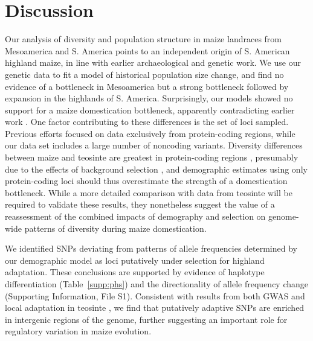  \section*{Discussion}

Our analysis of diversity and population structure in maize landraces from Mesoamerica and S. America points to an independent origin of S. American highland maize, in line with earlier archaeological \cite[]{Piperno_2006_69,Perry_2006_16511492,Grobman_2012_22307642} and genetic \citep{vanHeerwaarden_2011_21189301} work. 
We use our genetic data to fit a model of historical population size change, and find no evidence of a bottleneck in Mesoamerica but a strong bottleneck followed by expansion in the highlands of S. America. 
Surprisingly, our models showed no support for a maize domestication bottleneck, apparently contradicting earlier work \cite[]{Eyre-Walker_1998_9539756,Tenaillon_2004_15014173,Wright_2005_15919994}. 
One factor contributing to these differences is the set of loci sampled. 
Previous efforts focused on data exclusively from protein-coding regions, while our data set includes a large number of noncoding variants.
Diversity differences between maize and teosinte are greatest in protein-coding regions \citep{Hufford_2012_22660546}, presumably due to the effects of background selection \citep{Charlesworth_1993_8375663}, and demographic estimates using only protein-coding loci should thus overestimate the strength of a domestication bottleneck.
While a more detailed comparison with data from teosinte will be required to validate these results, they nonetheless suggest the value of a reassessment of the combined impacts of demography and selection on genome-wide patterns of diversity during maize domestication.

We identified SNPs deviating from patterns of allele frequencies determined by our demographic model as loci putatively under selection for highland adaptation.
These conclusions are supported by evidence of haplotype differentiation (Table~\ref{supp:phs}) and the directionality of allele frequency change (Supporting Information, File S1).
Consistent with results from both GWAS \citep{Wallace_2014_25474422} and local adaptation in teosinte \citep{Pyhajarvi2013}, we find that putatively adaptive SNPs are enriched in intergenic regions of the genome, further suggesting an important role for regulatory variation in maize evolution. 

